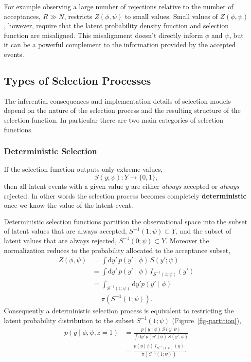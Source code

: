 \documentclass[
  letterpaper,
  DIV=11,
  numbers=noendperiod]{scrartcl}
\begin{document}
For example observing a large number of rejections relative to the
number of acceptances, \(R \gg N\), restricts \(Z(\phi, \psi)\) to small
values. Small values of \(Z(\phi, \psi)\), however, require that the
latent probability density function and selection function are
misaligned. This misalignment doesn't directly inform \(\phi\) and
\(\psi\), but it can be a powerful complement to the information
provided by the accepted events.

\subsection{Types of Selection
Processes}\label{types-of-selection-processes}

The inferential consequences and implementation details of selection
models depend on the nature of the selection process and the resulting
structure of the selection function. In particular there are two main
categories of selection functions.

\subsubsection{Deterministic Selection}\label{deterministic-selection}

If the selection function outputs only extreme values, \[
S(y; \psi) : Y \rightarrow \{ 0, 1 \},
\] then all latent events with a given value \(y\) are either
\emph{always} accepted or \emph{always} rejected. In other words the
selection process becomes completely \textbf{deterministic} once we know
the value of the latent event.

Deterministic selection functions partition the observational space into
the subset of latent values that are always accepted,
\(S^{-1}(1; \psi) \subset Y\), and the subset of latent values that are
always rejected, \(S^{-1}(0; \psi) \subset Y\). Moreover the
normalization reduces to the probability allocated to the acceptance
subset, \begin{align*}
Z(\phi, \psi)
&=
\int \mathrm{d}y' \, p(y' \mid \phi) \, S(y'; \psi )
\\
&=
\int \mathrm{d}y' \, p(y' \mid \phi) \, I_{S^{-1}(1; \psi)}(y')
\\
&=
\int_{S^{-1}(1; \psi)} \mathrm{d}y' p(y' \mid \phi)
\\
&=
\pi ( S^{-1}(1; \psi) ).
\end{align*} Consequently a deterministic selection process is
equivalent to restricting the latent probability distribution to the
subset \(S^{-1}(1; \psi)\) (Figure~\ref{fig-partition}), \begin{align*}
p(y \mid \phi, \psi, z = 1)
&=
\frac{ p(y \mid \phi) \, S(y; \psi ) }
{ \int \mathrm{d}y' \, p(y' \mid \phi) \, S(y'; \psi ) }
\\
&=
\frac{ p(y \mid \phi) \, I_{S^{-1}(1; \psi)}(y) }
{ \pi ( S^{-1}(1; \psi) ) }.
\end{align*}
\end{document}
